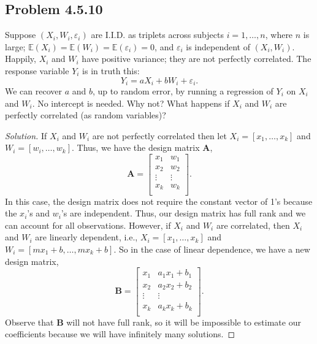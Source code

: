\documentclass{amsart}\usepackage[]{graphicx}\usepackage[]{color}
\newcommand{\ep}{\varepsilon}
\newcommand{\bvec}[1]{{\boldsymbol #1}}
\begin{document}
		\subsection*{Problem 4.5.10} %
		\label{ssub:problem_4_5_10}
			Suppose $(X_{i},W_{i},\ep_{i})$ are I.I.D. as triplets across subjects $i = 1,\dots,n$, where $n$ is large; $\mathbb{E}(X_{i}) = \mathbb{E}(W_{i}) = \mathbb{E}(\ep_{i}) = 0$, and $\ep_{i}$ is independent of $(X_{i}, W_{i})$.
			Happily, $X_{i}$ and $W_{i}$ have positive variance; they are not perfectly correlated.
			The response variable $Y_{i}$ is in truth this:
			$$Y_{i} = aX_{i} + bW_{i} + \ep_{i}.$$
			We can recover $a$ and $b$, up to random error, by running a regression of $Y_{i}$ on $X_{i}$ and $W_{i}$.
			No intercept is needed.
			Why not?
			What happens if $X_{i}$ and $W_{i}$ are perfectly correlated (as random variables)?
			\begin{proof}[Solution]
			If $X_{i}$ and $W_{i}$ are not perfectly correlated then let
			$X_{i} = [x_{1}, \dots, x_{k}]$	and $W_{i} = [w_{i}, \dots, w_{k}]$.
			Thus, we have the design matrix $\mathbf{A}$,
			$$\mathbf{A}=
			\begin{bmatrix}
			x_{1} & w_{1} \\
			x_{2} & w_{2} \\
			\vdots & \vdots \\
			x_k & w_k \\
			\end{bmatrix}.$$
			In this case, the design matrix does not require the constant vector of 1's because the $x_{i}$'s and $w_{i}$'s are independent.
			Thus, our design matrix has full rank and we can account for all observations.
			However, if $X_{i}$ and $W_{i}$ are correlated, then $X_{i}$ and $W_{i}$ are linearly dependent, i.e., $X_{i} = [x_{1}, \dots, x_{k}]$ and $W_{i}=[mx_{1}+b,\dots, mx_{k}+b]$.
			So in the case of linear dependence, we have a new design matrix,
			$$\mathbf{B}=
			\begin{bmatrix}
			x_{1} & a_{1}x_{1}+b_{1} \\
			x_{2} & a_{2}x_{2}+b_{2} \\
			\vdots & \vdots \\
			x_{k} & a_{k}x_{k}+b_{k}\\
			\end{bmatrix}.$$
			Observe that $\bvec{B}$ will not have full rank, so it will be impossible to estimate our coefficients because we will have infinitely many solutions.
			\end{proof}
\end{document}
